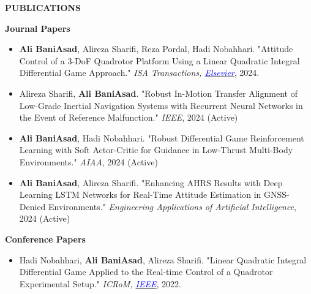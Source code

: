 \documentclass[12pt]{article}
\begin{document}
\vspace{0.2in} %


\begin{center}
	{\noindent \bfseries PUBLICATIONS}
\end{center}

\vspace{8pt} %


\noindent
{\bfseries Journal Papers}
\vspace{6pt}


\begin{itemize} \itemsep -2pt %
	\item \textbf{Ali BaniAsad}, Alireza Sharifi, Reza Pordal, Hadi Nobahhari. "Attitude Control of a 3-DoF Quadrotor Platform Using a Linear Quadratic Integral Differential Game Approach." \textit{ISA Transactions, 
        \href{https://doi.org/10.1016/j.isatra.2024.03.005}{\textcolor{blue}{Elsevier}}}, 2024.
	\item Alireza Sharifi, \textbf{Ali BaniAsad}. "Robust In-Motion Transfer Alignment of Low-Grade Inertial Navigation Systems with Recurrent Neural Networks in the Event of Reference Malfunction." \textit{IEEE}, 2024 (Active)
	\item \textbf{Ali BaniAsad}, Hadi Nobahhari. "Robust Differential Game Reinforcement Learning with Soft Actor-Critic for Guidance in Low-Thrust Multi-Body Environments." \textit{AIAA}, 2024 (Active)
	\item \textbf{Ali BaniAsad}, Alireza Sharifi. "Enhancing AHRS Results with Deep Learning LSTM Networks for Real-Time Attitude Estimation in GNSS-Denied Environments." \textit{Engineering Applications of Artificial Intelligence}, 2024 (Active) 
\end{itemize}

\vspace{0.2in} %
\noindent
{\bfseries Conference Papers}

\vspace{6pt}
\begin{itemize} \itemsep -2pt %
	\item Hadi Nobahhari,  \textbf{Ali BaniAsad}, Alireza Sharifi. "Linear Quadratic Integral Differential Game Applied to the Real-time Control of a Quadrotor Experimental Setup." \textit{ICRoM, \href{https://doi.org/10.1109/ICRoM57054.2022.10025263}{\textcolor{blue}{IEEE}}}, 2022.
\end{itemize}
\end{document}
